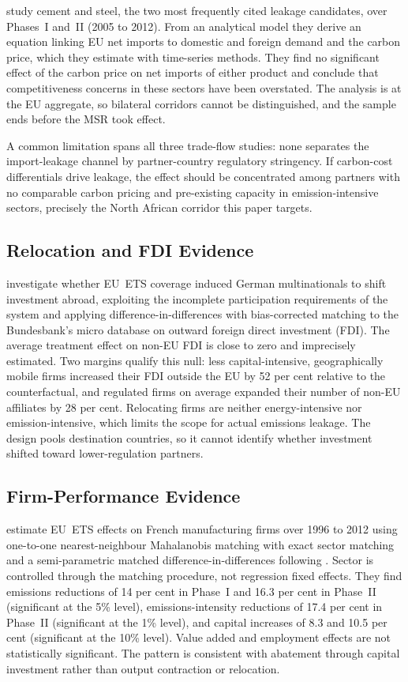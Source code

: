 \citet{branger2016} study cement and steel, the two most frequently cited leakage candidates, over Phases~I and~II (2005 to 2012). From an analytical model they derive an equation linking EU net imports to domestic and foreign demand and the carbon price, which they estimate with time-series methods. They find no significant effect of the carbon price on net imports of either product and conclude that competitiveness concerns in these sectors have been overstated. The analysis is at the EU aggregate, so bilateral corridors cannot be distinguished, and the sample ends before the MSR took effect.

A common limitation spans all three trade-flow studies: none separates the import-leakage channel by partner-country regulatory stringency. If carbon-cost differentials drive leakage, the effect should be concentrated among partners with no comparable carbon pricing and pre-existing capacity in emission-intensive sectors, precisely the North African corridor this paper targets.

\subsection{Relocation and FDI Evidence}

\citet{koch2019} investigate whether EU~ETS coverage induced German multinationals to shift investment abroad, exploiting the incomplete participation requirements of the system and applying difference-in-differences with bias-corrected matching to the Bundesbank's micro database on outward foreign direct investment (FDI). The average treatment effect on non-EU FDI is close to zero and imprecisely estimated. Two margins qualify this null: less capital-intensive, geographically mobile firms increased their FDI outside the EU by 52 per cent relative to the counterfactual, and regulated firms on average expanded their number of non-EU affiliates by 28 per cent. Relocating firms are neither energy-intensive nor emission-intensive, which limits the scope for actual emissions leakage. The design pools destination countries, so it cannot identify whether investment shifted toward lower-regulation partners.

\subsection{Firm-Performance Evidence}

\citet{colmer2025} estimate EU~ETS effects on French manufacturing firms over 1996 to 2012 using one-to-one nearest-neighbour Mahalanobis matching with exact sector matching and a semi-parametric matched difference-in-differences following \citet{heckman1997}. Sector is controlled through the matching procedure, not regression fixed effects. They find emissions reductions of 14 per cent in Phase~I and 16.3 per cent in Phase~II (significant at the 5\% level), emissions-intensity reductions of 17.4 per cent in Phase~II (significant at the 1\% level), and capital increases of 8.3 and 10.5 per cent (significant at the 10\% level). Value added and employment effects are not statistically significant. The pattern is consistent with abatement through capital investment rather than output contraction or relocation.

